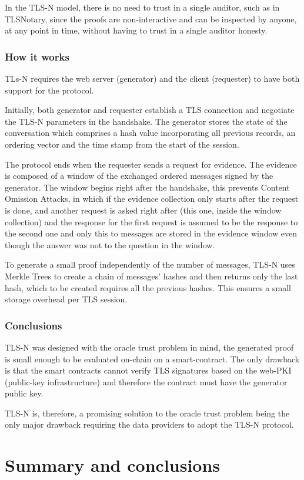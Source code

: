 In the TLS-N model, there is no need to trust in a single auditor, such as in TLSNotary, since the proofs are non-interactive and can be inspected by anyone, at any point in time, without having to trust in a single auditor honesty.


\subsubsection{How it works}
TLs-N requires the web server (generator) and the client (requester) to have both support for the protocol.

Initially, both generator and requester establish a TLS connection and negotiate the TLS-N parameters in the handshake. The generator stores the state of the conversation which comprises a hash value incorporating all previous records, an ordering vector and the time stamp from the start of the session.

The protocol ends when the requester sends a request for evidence. The evidence is composed of a window of the exchanged ordered messages signed by the generator. The window begins right after the handshake, this prevents Content Omission Attacks, in which if the evidence collection only starts after the request is done, and another request is asked right after (this one, inside the window collection) and the response for the first request is assumed to be the response to the second one and only this to messages are stored in the evidence window even though the answer was not to the question in the window.

To generate a small proof independently of the number of messages, TLS-N uses Merkle Trees to create a chain of messages' hashes and then returns only the last hash, which to be created requires all the previous hashes. This ensures a small storage overhead per TLS session.


\subsubsection{Conclusions}
TLS-N was designed with the oracle trust problem in mind, the generated proof is small enough to be evaluated on-chain on a smart-contract. The only drawback is that the smart contracts cannot verify TLS signatures based on the web-PKI (public-key infrastructure) and therefore the contract must have the generator public key.

TLS-N is, therefore, a promising solution to the oracle trust problem being the only major drawback requiring the data providers to adopt the TLS-N protocol.


\section{Summary and conclusions}
